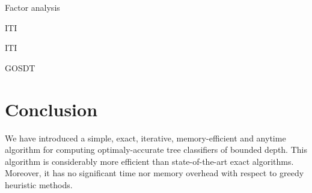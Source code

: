 \documentclass{llncs}
\begin{document}
\begin{table}[htbp]
\begin{center}
\begin{footnotesize}
\tabcolsep=2pt

\end{footnotesize}
\end{center}
\caption{\label{tab:factor} Factor analysis}
\end{table}

\begin{table}[htbp]
\begin{center}
\begin{footnotesize}
\tabcolsep=5pt

\end{footnotesize}
\end{center}
\caption{\label{tab:iti} ITI}
\end{table}


\begin{table}[htbp]
\begin{center}
\begin{footnotesize}
\tabcolsep=5pt

\end{footnotesize}
\end{center}
\caption{\label{tab:iti} ITI}
\end{table}



\begin{table}[htbp]
\begin{center}
\begin{footnotesize}
\tabcolsep=5pt

\end{footnotesize}
\end{center}
\caption{\label{tab:gosdt} GOSDT}
\end{table}



\section{Conclusion}

We have introduced a simple, exact, iterative, memory-efficient and anytime algorithm for computing optimaly-accurate tree classifiers of bounded depth.
This algorithm is considerably more efficient than state-of-the-art exact algorithms. Moreover, it has no significant time nor memory overhead with respect to greedy heuristic methods.




\end{document}
